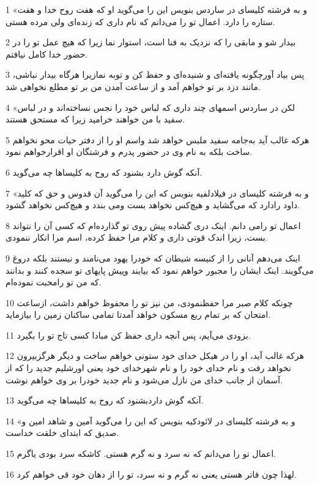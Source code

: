 \par 1 «و به فرشته کلیسای در ساردس بنویس این را می‌گوید او که هفت روح خدا و هفت ستاره را دارد. اعمال تو را می‌دانم که نام داری که زنده‌ای ولی مرده هستی.
\par 2 بیدار شو و مابقی را که نزدیک به فنا است، استوار نما زیرا که هیچ عمل تو را در حضور خدا کامل نیافتم.
\par 3 پس بیاد آورچگونه یافته‌ای و شنیده‌ای و حفظ کن و توبه نمازیرا هرگاه بیدار نباشی، مانند دزد بر تو خواهم آمد و از ساعت آمدن من بر تو مطلع نخواهی شد.
\par 4 «لکن در ساردس اسمهای چند داری که لباس خود را نجس نساخته‌اند و در لباس سفید با من خواهند خرامید زیرا که مستحق هستند.
\par 5 هرکه غالب آید به‌جامه سفید ملبس خواهد شد واسم او را از دفتر حیات محو نخواهم ساخت بلکه به نام وی در حضور پدرم و فرشتگان او اقرارخواهم نمود.
\par 6 آنکه گوش دارد بشنود که روح به کلیساها چه می‌گوید.
\par 7 «و به فرشته کلیسای در فیلادلفیه بنویس که این را می‌گوید آن قدوس و حق که کلید داود رادارد که می‌گشاید و هیچ‌کس نخواهد بست ومی بندد و هیچ‌کس نخواهد گشود.
\par 8 اعمال تو رامی دانم. اینک دری گشاده پیش روی تو گذارده‌ام که کسی آن را نتواند بست، زیرا اندک قوتی داری و کلام مرا حفظ کرده، اسم مرا انکار ننمودی.
\par 9 اینک می‌دهم آنانی را از کنیسه شیطان که خودرا یهود می‌نامند و نیستند بلکه دروغ می‌گویند. اینک ایشان را مجبور خواهم نمود که بیایند وپیش پایهای تو سجده کنند و بدانند که من تو رامحبت نموده‌ام.
\par 10 چونکه کلام صبر مرا حفظنمودی، من نیز تو را محفوظ خواهم داشت، ازساعت امتحان که بر تمام ربع مسکون خواهد آمدتا تمامی ساکنان زمین را بیازماید.
\par 11 بزودی می‌آیم، پس آنچه داری حفظ کن مبادا کسی تاج تو را بگیرد.
\par 12 هر‌که غالب آید، او را در هیکل خدای خود ستونی خواهم ساخت و دیگر هرگزبیرون نخواهد رفت و نام خدای خود را و نام شهرخدای خود یعنی اورشلیم جدید را که از آسمان از جانب خدای من نازل می‌شود و نام جدید خودرا بر وی خواهم نوشت.
\par 13 آنکه گوش داردبشنود که روح به کلیساها چه می‌گوید.
\par 14 «و به فرشته کلیسای در لائودکیه بنویس که این را می‌گوید آمین و شاهد امین و صدیق که ابتدای خلقت خداست.
\par 15 اعمال تو را می‌دانم که نه سرد و نه گرم هستی. کاشکه سرد بودی یاگرم.
\par 16 لهذا چون فاتر هستی یعنی نه گرم و نه سرد، تو را از دهان خود قی خواهم کرد.
